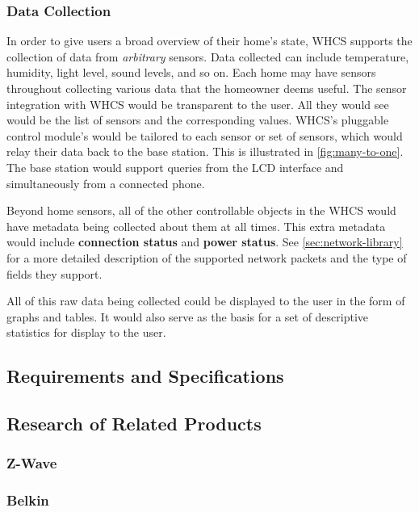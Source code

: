 \subsubsection{Data Collection}
In order to give users a broad overview of their home's state, WHCS supports
the collection of data from \emph{arbitrary} sensors. Data collected can
include temperature, humidity, light level, sound levels, and so on. Each home
may have sensors throughout collecting various data that the homeowner deems
useful. The sensor integration with WHCS would be transparent to the user. All
they would see would be the list of sensors and the corresponding values.
WHCS's pluggable control module's would be tailored to each sensor or set of
sensors, which would relay their data back to the base station. This is
illustrated in \autoref{fig:many-to-one}. The base station would support
queries from the LCD interface and simultaneously from a connected phone.


Beyond home sensors, all of the other controllable objects in the WHCS
would have metadata being collected about them at all times. This extra metadata
would include \textbf{connection status} and \textbf{power status}. See
\autoref{sec:network-library} for a more detailed description of the supported
network packets and the type of fields they support.

All of this raw data being collected could be displayed to the user in the form
of graphs and tables. It would also serve as the basis for a set of descriptive
statistics for display to the user.

\subsection{Requirements and Specifications}

\subsection{Research of Related Products}

\subsubsection{Z-Wave}

\subsubsection{Belkin}

